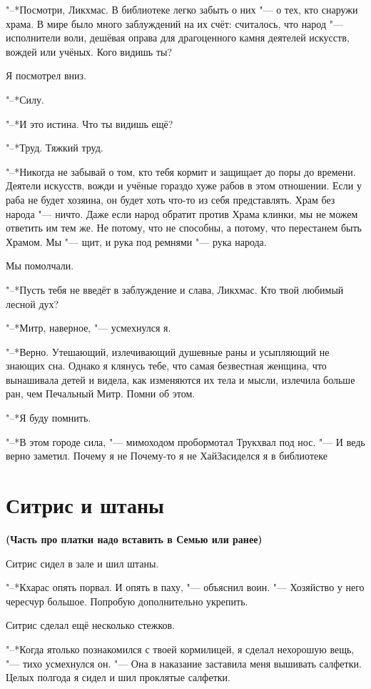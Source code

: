 "--*Посмотри, Ликхмас.
В библиотеке легко забыть о них "--- о тех, кто снаружи храма.
В мире было много заблуждений на их счёт: считалось, что народ "--- исполнители воли, дешёвая оправа для драгоценного камня деятелей искусств, вождей или учёных.
Кого видишь ты?

Я посмотрел вниз.

"--*Силу.

"--*И это истина.
Что ты видишь ещё?

"--*Труд.
Тяжкий труд.

"--*Никогда не забывай о том, кто тебя кормит и защищает до поры до времени.
Деятели искусств, вожди и учёные гораздо хуже рабов в этом отношении.
Если у раба не будет хозяина, он будет хоть что-то из себя представлять.
Храм без народа "--- ничто.
Даже если народ обратит против Храма клинки, мы не можем ответить им тем же.
Не потому, что не способны, а потому, что перестанем быть Храмом.
Мы "--- щит, и рука под ремнями "--- рука народа.

Мы помолчали.

"--*Пусть тебя не введёт в заблуждение и слава, Ликхмас.
Кто твой любимый лесной дух?

"--*Митр, наверное, "--- усмехнулся я.

"--*Верно.
Утешающий, излечивающий душевные раны и усыпляющий не знающих сна.
Однако я клянусь тебе, что самая безвестная женщина, что вынашивала детей и видела, как изменяются их тела и мысли, излечила больше ран, чем Печальный Митр.
Помни об этом.

"--*Я буду помнить.

"--*В этом городе сила, "--- мимоходом пробормотал Трукхвал под нос.
"--- И ведь верно заметил.
Почему я не\ldotsq
Почему-то я не\ldotst
Хай\ldotst Засиделся я в библиотеке\ldotst

\section{Ситрис и штаны}

\textbf{(Часть про платки надо вставить в Семью или ранее)}

Ситрис сидел в зале и шил штаны.

"--*Кхарас опять порвал.
И опять в паху, "--- объяснил воин.
"--- Хозяйство у него чересчур большое.
Попробую дополнительно укрепить.

Ситрис сделал ещё несколько стежков.

"--*Когда я\ldotst только познакомился с твоей кормилицей, я сделал нехорошую вещь, "--- тихо усмехнулся он.
"--- Она в наказание заставила меня вышивать салфетки.
Целых полгода я сидел и шил проклятые салфетки.

